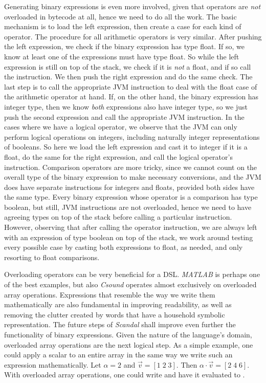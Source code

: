Generating binary expressions is even more involved, given that operators are \emph{not} overloaded in bytecode at all, hence we need to do all the work. The basic mechanism is to load the left expression, then create a case for each kind of operator. The procedure for all arithmetic operators is very similar. After pushing the left expression, we check if the binary expression has type float. If so, we know at least one of the expressions must have type float. So while the left expression is still on top of the stack, we check if it is \emph{not} a float, and if so call the  instruction. We then push the right expression and do the same check. The last step is to call the appropriate JVM instruction to deal with the float case of the arithmetic operator at hand. If, on the other hand, the binary expression has integer type, then we know \emph{both} expressions also have integer type, so we just push the second expression and call the appropriate JVM instruction. In the cases where we have a logical operator, we observe that the JVM can only perform logical operations on integers, including naturally integer representations of booleans. So here we load the left expression and cast it to integer if it is a float, do the same for the right expression, and call the logical operator's instruction. Comparison operators are more tricky, since we cannot count on the overall type of the binary expression to make necessary conversions, and the JVM does have separate instructions for integers and floats, provided both sides have the same type. Every binary expression whose operator is a comparison has type boolean, but still, JVM instructions are not overloaded, hence we need to have agreeing types on top of the stack before calling a particular instruction. However, observing that after calling the operator instruction, we are always left with an expression of type boolean on top of the stack, we work around testing every possible case by casting both expressions to float, as needed, and only resorting to float comparisons.

Overloading operators can be very beneficial for a DSL. \emph{MATLAB} is perhaps one of the best examples, but also \emph{Csound} operates almost exclusively on overloaded array operations. Expressions that resemble the way we write them mathematically are also fundamental in improving readability, as well as removing the clutter created by words that have a household symbolic representation. The future steps of \emph{Scandal} shall improve even further the functionality of binary expressions. Given the nature of the language's domain, overloaded array operations are the next logical step. As a simple example, one could apply a scalar to an entire array in the same way we write such an expression mathematically. Let $\alpha = 2$ and $\vec{v} = [1 \; 2 \; 3]$. Then $\alpha \cdot \vec{v} = [2 \; 4 \; 6]$. With overloaded array operations, one could write  and have it evaluated to \il{[2, 4, 6]}.

